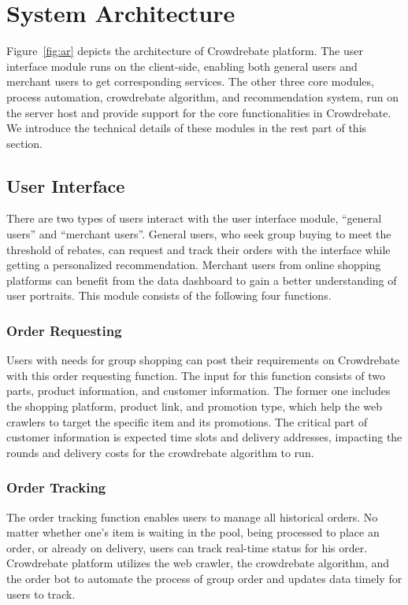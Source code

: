 \section{System Architecture}

Figure~\ref{fig:ar} depicts the architecture of Crowdrebate platform. The user interface module runs on the client-side, enabling both general users and merchant users to get corresponding services. The other three core modules, process automation, crowdrebate algorithm, and recommendation system, run on the server host and provide support for the core functionalities in Crowdrebate. We introduce the technical details of these modules in the rest part of this section.

\subsection{User Interface}

There are two types of users interact with the user interface module, ``general users'' and ``merchant users''. General users, who seek group buying to meet the threshold of rebates, can request and track their orders with the interface while getting a personalized recommendation. Merchant users from online shopping platforms can benefit from the data dashboard to gain a better understanding of user portraits. This module consists of the following four functions.

\subsubsection{Order Requesting}

Users with needs for group shopping can post their requirements on Crowdrebate with this order requesting function. The input for this function consists of two parts, product information, and customer information. The former one includes the shopping platform, product link, and promotion type, which help the web crawlers to target the specific item and its promotions. The critical part of customer information is expected time slots and delivery addresses, impacting the rounds and delivery costs for the crowdrebate algorithm to run.

\subsubsection{Order Tracking}

The order tracking function enables users to manage all historical orders. No matter whether one's item is waiting in the pool, being processed to place an order, or already on delivery, users can track real-time status for his order. Crowdrebate platform utilizes the web crawler, the crowdrebate algorithm, and the order bot to automate the process of group order and updates data timely for users to track.
	
